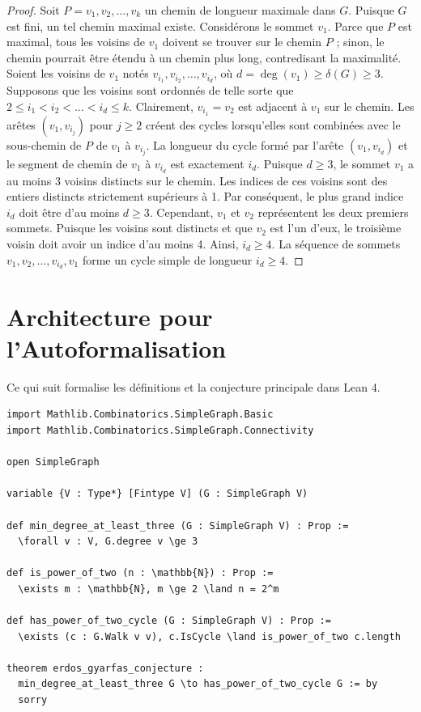 \documentclass[11pt, a4paper]{article}
\begin{document}
\begin{proof}
Soit $P = v_1, v_2, \dots, v_k$ un chemin de longueur maximale dans $G$. Puisque $G$ est fini, un tel chemin maximal existe.
Consid\'erons le sommet $v_1$. Parce que $P$ est maximal, tous les voisins de $v_1$ doivent se trouver sur le chemin $P$ ; sinon, le chemin pourrait \^etre \'etendu \`a un chemin plus long, contredisant la maximalit\'e.
Soient les voisins de $v_1$ not\'es $v_{i_1}, v_{i_2}, \dots, v_{i_d}$, o\`u $d = \deg(v_1) \ge \delta(G) \ge 3$.
Supposons que les voisins sont ordonn\'es de telle sorte que $2 \le i_1 < i_2 < \dots < i_d \le k$.
Clairement, $v_{i_1} = v_2$ est adjacent \`a $v_1$ sur le chemin. Les ar\^etes $(v_1, v_{i_j})$ pour $j \ge 2$ cr\'eent des cycles lorsqu'elles sont combin\'ees avec le sous-chemin de $P$ de $v_1$ \`a $v_{i_j}$.
La longueur du cycle form\'e par l'ar\^ete $(v_1, v_{i_d})$ et le segment de chemin de $v_1$ \`a $v_{i_d}$ est exactement $i_d$.
Puisque $d \ge 3$, le sommet $v_1$ a au moins 3 voisins distincts sur le chemin.
Les indices de ces voisins sont des entiers distincts strictement sup\'erieurs \`a 1.
Par cons\'equent, le plus grand indice $i_d$ doit \^etre d'au moins $d \ge 3$. Cependant, $v_1$ et $v_2$ repr\'esentent les deux premiers sommets.
Puisque les voisins sont distincts et que $v_2$ est l'un d'eux, le troisi\`eme voisin doit avoir un indice d'au moins 4.
Ainsi, $i_d \ge 4$.
La s\'equence de sommets $v_1, v_2, \dots, v_{i_d}, v_1$ forme un cycle simple de longueur $i_d \ge 4$.
\end{proof}

\section{Architecture pour l'Autoformalisation}

Ce qui suit formalise les d\'efinitions et la conjecture principale dans Lean 4.

\begin{verbatim}
import Mathlib.Combinatorics.SimpleGraph.Basic
import Mathlib.Combinatorics.SimpleGraph.Connectivity

open SimpleGraph

variable {V : Type*} [Fintype V] (G : SimpleGraph V)

def min_degree_at_least_three (G : SimpleGraph V) : Prop :=
  \forall v : V, G.degree v \ge 3

def is_power_of_two (n : \mathbb{N}) : Prop :=
  \exists m : \mathbb{N}, m \ge 2 \land n = 2^m

def has_power_of_two_cycle (G : SimpleGraph V) : Prop :=
  \exists (c : G.Walk v v), c.IsCycle \land is_power_of_two c.length

theorem erdos_gyarfas_conjecture :
  min_degree_at_least_three G \to has_power_of_two_cycle G := by
  sorry
\end{verbatim}
\end{document}
